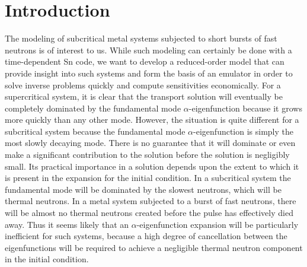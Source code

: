 \documentclass[12pt]{article}
\begin{document}
\section{Introduction}
The modeling of subcritical metal systems subjected to short bursts of fast neutrons is of interest 
to us.  While such modeling can certainly be done with a time-dependent Sn code, we want to develop a
reduced-order model that can provide insight into such systems and form the basis of an emulator in 
order to solve inverse problems quickly and compute sensitivities economically.  For a supercritical 
system, it is clear that the transport solution will eventually be completely dominated by the 
fundamental mode $\alpha$-eigenfunction because it grows more quickly than any other mode.  However, the 
situation is quite different for a subcritical system because the fundamental mode $\alpha$-eigenfunction 
is simply the most slowly decaying mode.  There is no guarantee that it will dominate or even make a significant 
contribution to the solution before the solution is negligibly small.  Its practical importance in a solution 
depends upon the extent to which it is present in the expansion for the initial condition.  In 
a subcritical system the fundamental mode will be dominated by the slowest neutrons, which will be thermal 
neutrons. In a metal system subjected to a burst of fast neutrons, there will be almost no thermal neutrons 
created before the pulse has effectively died away.  Thus it seems likely that an $\alpha$-eigenfunction expansion 
will be particularly inefficient for such systems, because a high degree of cancellation between the eigenfunctions 
will be required to achieve a negligible thermal neutron component in the initial condition.  
\end{document}
